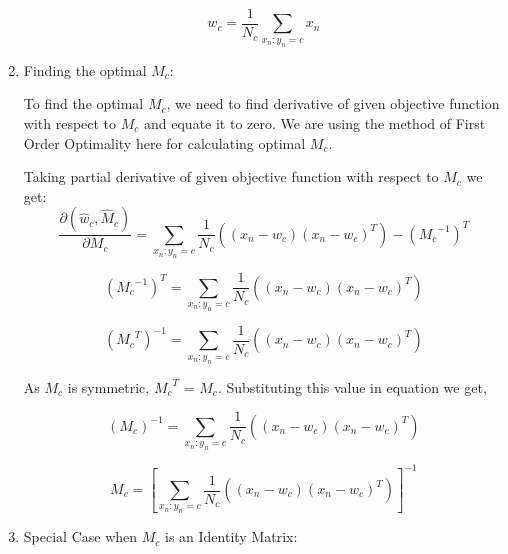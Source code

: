 \documentclass[a4paper,11pt]{article}
\begin{document}
\begin{mlsolution}
\begin{enumerate}
		\begin{equation*}
		\boxed{w_c  = \frac{1}{N_c}\sum_{x_n: y_n = c}  x_n } 
		\end{equation*}
		
		\item Finding the optimal $ M_c $:
		
		To find the optimal $ M_c $, we need to find derivative of given objective function with respect to $ M_c $ and equate it to zero.	We are using the method of First Order Optimality here for calculating optimal $M_c$.
		
		Taking partial derivative of given objective function with respect to $M_c$ we get:	
		\begin{equation*}
		\frac{\partial (\hat{w}_c,\hat{M}_c)}{\partial M_c} =	\sum_{x_n: y_n = c} \frac{1}{N_c}((x_n - w_c)(x_n - w_c)^T) - ({M_c}^{-1})^T
		\end{equation*}
		
		\begin{equation*}
		  ({M_c}^{-1})^T =	\sum_{x_n: y_n = c} \frac{1}{N_c}((x_n - w_c)(x_n - w_c)^T)
		\end{equation*}
		
		\begin{equation*}
			({M_c}^T)^{-1} =	\sum_{x_n: y_n = c} \frac{1}{N_c}((x_n - w_c)(x_n - w_c)^T)
		\end{equation*}
		
		As $M_c$ is symmetric, ${M_c}^T$ = $M_c$.
		Substituting this value in equation we get,
		
		\begin{equation*}
			({M_c})^{-1} =	\sum_{x_n: y_n = c} \frac{1}{N_c}((x_n - w_c)(x_n - w_c)^T)
		\end{equation*}
		
		\begin{equation*}
			\boxed{M_c =	\left[\sum_{x_n: y_n = c} \frac{1}{N_c}((x_n - w_c)(x_n - w_c)^T)\right]^{-1}}
		\end{equation*}
		
	
	
	\item Special Case when $M_c$ is an Identity Matrix:
	

\end{enumerate}
\end{mlsolution}
\end{document}
